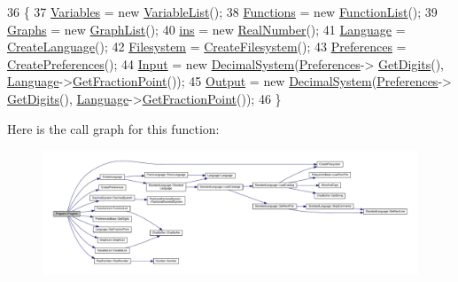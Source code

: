 \begin{DoxyCode}
36 \{
37     \hyperlink{classProgram_a1d4f53befb0270e64c91c24d14061188}{Variables} = \textcolor{keyword}{new} \hyperlink{classVariableList}{VariableList}();
38     \hyperlink{classProgram_ac643877adc06800a021263b2234cd236}{Functions} = \textcolor{keyword}{new} \hyperlink{classFunctionList}{FunctionList}();
39     \hyperlink{classProgram_a9c59323b8c560d2d418a6e6ebcde2e9d}{Graphs} = \textcolor{keyword}{new} \hyperlink{classGraphList}{GraphList}();
40     \hyperlink{classProgram_a2e25341cb34cfdd6446deeadd0629528}{ins} = \textcolor{keyword}{new} \hyperlink{structRealNumber}{RealNumber}();
41     \hyperlink{classLanguage}{Language} = \hyperlink{io_8h_a28bdfc208e3840f49d1af4a4196013e1}{CreateLanguage}();
42     \hyperlink{classProgram_a54fb0dc3ee40a356fe91cea64e569b26}{Filesystem} = \hyperlink{io_8h_aaf891622b11e0bb888ebf08612884aa8}{CreateFilesystem}();
43     \hyperlink{classProgram_ad6baa89972cb4938db341c77c1510793}{Preferences} = \hyperlink{io_8h_ae6bd8b440ad1736316165c2f8aac43bf}{CreatePreferences}();
44     \hyperlink{classProgram_a6327f15962926e4f74f15e8ff56e04e5}{Input} = \textcolor{keyword}{new} \hyperlink{classDecimalSystem}{DecimalSystem}(\hyperlink{classProgram_ad6baa89972cb4938db341c77c1510793}{Preferences}->
      \hyperlink{classPreferencesBase_a8d693cb289d1f5282f13c0cfb698b8cc}{GetDigits}(), \hyperlink{classLanguage}{Language}->\hyperlink{classLanguage_a4c214f08d47e84d53f37bcb5b1fe1b65}{GetFractionPoint}());
45     \hyperlink{classProgram_ac6e84e81a8bbdf99de5beea93713d8ee}{Output} = \textcolor{keyword}{new} \hyperlink{classDecimalSystem}{DecimalSystem}(\hyperlink{classProgram_ad6baa89972cb4938db341c77c1510793}{Preferences}->
      \hyperlink{classPreferencesBase_a8d693cb289d1f5282f13c0cfb698b8cc}{GetDigits}(), \hyperlink{classLanguage}{Language}->\hyperlink{classLanguage_a4c214f08d47e84d53f37bcb5b1fe1b65}{GetFractionPoint}());
46 \}
\end{DoxyCode}


Here is the call graph for this function\+:
\nopagebreak
\begin{figure}[H]
\begin{center}
\leavevmode
\includegraphics[width=350pt]{dc/db5/classProgram_aaefaa0df08f3484476fc4d61e97acbdc_cgraph}
\end{center}
\end{figure}




